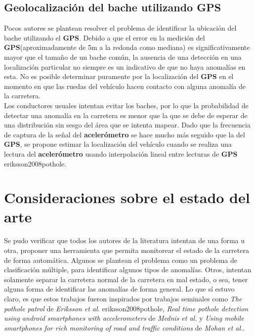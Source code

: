 	\subsection{Geolocalización del bache utilizando GPS}
		Pocos autores se plantean resolver el problema de identificar la ubicación del bache utilizando el \textbf{GPS}. Debido a que el
		error en la medición del \textbf{GPS}(aproximadamente de 5m a la redonda como mediana) es significativamente mayor que el tamaño de un bache
		común, la ausencia de una detección en una localización particular no siempre es un indicativo de que no haya anomalías en esta. No es
		posible determinar puramente por la localización del \textbf{GPS} en el momento en que las ruedas del vehículo hacen contacto con alguna
		anomalía de la carretera.\\
		\indent Los conductores usuales intentan evitar los baches, por lo que la probabilidad de detectar una anomalía en la carretera es menor que la
		que se debe de esperar de una distribución sin sesgo del área que se intenta mapear. Dado que la frecuencia
		de captura de la señal del \textbf{acelerómetro} se hace mucho más seguido que la del \textbf{GPS}, se propone estimar la localización del
		vehículo cuando se realiza una lectura del \textbf{acelerómetro} usando interpolación lineal entre lecturas de \textbf{GPS}\brackcite
		{eriksson2008pothole}.

\section{Consideraciones sobre el estado del arte}
	Se pudo verificar que todos los autores de la literatura intentan de una forma u otra, proponer una herramienta que permita monitorear el estado de
	la carretera de forma automática. Algunos se plantean el problema como un problema de clasificación múltiple, para identificar algunos tipos de anomalías.
	Otros, intentan solamente separar la carretera normal de la carretera en mal estado, o sea, tener alguna forma de identificar las anomalías de forma general.
	Lo que sí estuvo claro, es que estos trabajos fueron inspirados por trabajos seminales como \emph{The pothole patrol} de \emph{Eriksson et al.}\brackcite
	{eriksson2008pothole}, \emph{Real time pothole detection using android smartphones with accelerometers} de \emph{Mednis et al.} y 
	\emph{Using mobile smartphones for rich monitoring of road and traffic conditions} de \emph{Mohan et al.}. 

